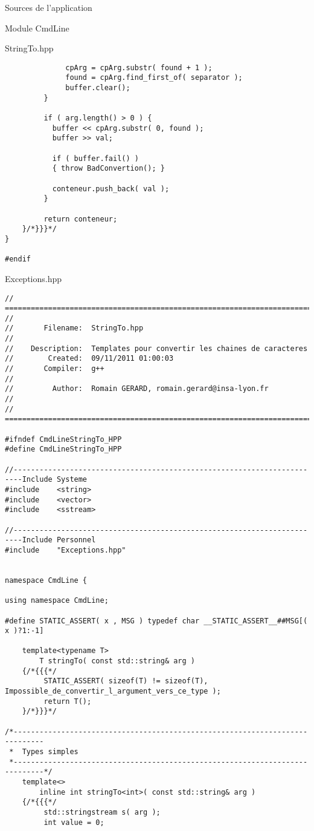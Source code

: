 \documentclass{article}
\begin{document}
\begin{section}{Sources de l'application}
\begin{subsection}{Module CmdLine}
\begin{paragraph}{StringTo.hpp}
\begin{verbatim}
              cpArg = cpArg.substr( found + 1 );
              found = cpArg.find_first_of( separator );
              buffer.clear();
         }

         if ( arg.length() > 0 ) {
           buffer << cpArg.substr( 0, found );
           buffer >> val;

           if ( buffer.fail() )
           { throw BadConvertion(); }
           
           conteneur.push_back( val );
         }

         return conteneur;
    }/*}}}*/
}

#endif
  \end{verbatim}
  \end{paragraph}


  \newpage
  \begin{paragraph}{Exceptions.hpp}
   \begin{verbatim}
// =====================================================================================
// 
//       Filename:  StringTo.hpp
// 
//    Description:  Templates pour convertir les chaines de caracteres
//        Created:  09/11/2011 01:00:03
//       Compiler:  g++
// 
//         Author:  Romain GERARD, romain.gerard@insa-lyon.fr
// 
// =====================================================================================

#ifndef CmdLineStringTo_HPP
#define CmdLineStringTo_HPP

//------------------------------------------------------------------------Include Systeme
#include	<string>
#include	<vector>
#include	<sstream>

//------------------------------------------------------------------------Include Personnel
#include	"Exceptions.hpp"


namespace CmdLine {

using namespace CmdLine;

#define STATIC_ASSERT( x , MSG ) typedef char __STATIC_ASSERT__##MSG[( x )?1:-1]

    template<typename T>
        T stringTo( const std::string& arg )
    {/*{{{*/       
         STATIC_ASSERT( sizeof(T) != sizeof(T),  Impossible_de_convertir_l_argument_vers_ce_type );
         return T();
    }/*}}}*/

/*-----------------------------------------------------------------------------
 *  Types simples
 *-----------------------------------------------------------------------------*/
    template<>
        inline int stringTo<int>( const std::string& arg )
    {/*{{{*/
         std::stringstream s( arg );
         int value = 0;


\end{verbatim}
\end{paragraph}
\end{subsection}
\end{section}
\end{document}
